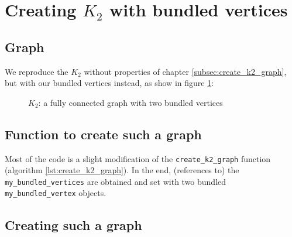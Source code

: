\section{Creating $K_{2}$ with bundled vertices}
\label{subsec:create_bundled_vertices_k2_graph}

\subsection{Graph}

We reproduce the $K_{2}$ without properties of 
chapter \ref{subsec:create_k2_graph}, 
but with our bundled vertices instead, 
as show in figure \ref{fig:bundled_vertices_k2_graph}:

%
%
\begin{figure}
  \caption{
    $K_{2}$: a fully connected graph with two bundled vertices
  }
  \label{fig:bundled_vertices_k2_graph}
\end{figure}

\subsection{Function to create such a graph}



Most of the code is a slight modification of the 
\verb;create_k2_graph; function 
(algorithm \ref{lst:create_k2_graph}).
In the end, (references to) the \verb;my_bundled_vertices; 
are obtained and set with two bundled \verb;my_bundled_vertex; objects.

\subsection{Creating such a graph}

